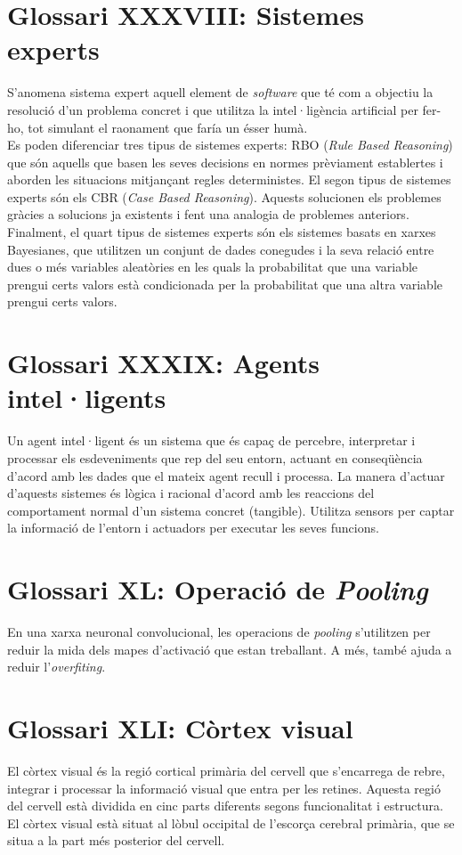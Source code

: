 \documentclass[a4paper,12pt]{report}
\begin{document}
\section*{Glossari XXXVIII: Sistemes experts}
S'anomena sistema expert aquell element de \textit{software} que té com a objectiu la resolució d'un problema concret i que utilitza la intel·ligència artificial per fer-ho, tot simulant el raonament que faría un ésser humà.\\
Es poden diferenciar tres tipus de sistemes experts: RBO (\textit{Rule Based Reasoning}) que són aquells que basen les seves decisions en normes prèviament establertes i aborden les situacions mitjançant regles deterministes. El segon tipus de sistemes experts són els CBR (\textit{Case Based Reasoning}). Aquests solucionen els problemes gràcies a solucions ja existents i fent una analogia de problemes anteriors. Finalment, el quart tipus de sistemes experts són els sistemes basats en xarxes Bayesianes, que utilitzen un conjunt de dades conegudes i la seva relació entre dues o més variables aleatòries en les quals la probabilitat que una variable prengui certs valors està condicionada per la probabilitat que una altra variable prengui certs valors.
\section*{Glossari XXXIX: Agents intel·ligents}
Un agent intel·ligent és un sistema que és capaç de percebre, interpretar i processar els esdeveniments que rep del seu entorn, actuant en conseqüència d'acord amb les dades que el mateix agent recull i processa. La manera d'actuar d'aquests sistemes és lògica i racional d'acord amb les reaccions del comportament normal d'un sistema concret (tangible). Utilitza sensors per captar la informació de l'entorn i actuadors per executar les seves funcions.
\section*{Glossari XL: Operació de \textit{Pooling}}
En una xarxa neuronal convolucional, les operacions de \textit{pooling} s'utilitzen per reduir la mida dels mapes d'activació que estan treballant. A més, també ajuda a reduir l'\textit{overfiting}.
\section*{Glossari XLI: Còrtex visual}
El còrtex visual és la regió cortical primària del cervell que s'encarrega de rebre, integrar i processar la informació visual que entra per les retines. Aquesta regió del cervell està dividida en cinc parts diferents segons funcionalitat i estructura. El còrtex visual està situat al lòbul occipital de l'escorça cerebral primària, que se situa a la part més posterior del cervell.
\end{document}
